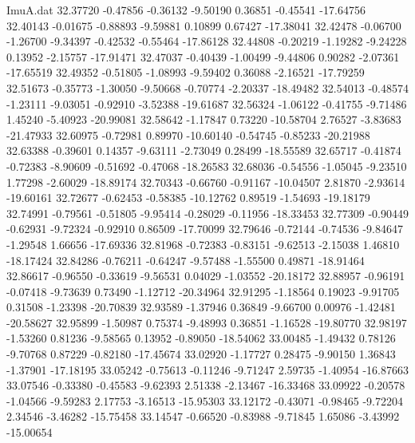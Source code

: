 \begin{filecontents}{ImuA.dat}
  32.37720   -0.47856   -0.36132   -9.50190    0.36851   -0.45541  -17.64756
  32.40143   -0.01675   -0.88893   -9.59881    0.10899    0.67427  -17.38041
  32.42478   -0.06700   -1.26700   -9.34397   -0.42532   -0.55464  -17.86128
  32.44808   -0.20219   -1.19282   -9.24228    0.13952   -2.15757  -17.91471
  32.47037   -0.40439   -1.00499   -9.44806    0.90282   -2.07361  -17.65519
  32.49352   -0.51805   -1.08993   -9.59402    0.36088   -2.16521  -17.79259
  32.51673   -0.35773   -1.30050   -9.50668   -0.70774   -2.20337  -18.49482
  32.54013   -0.48574   -1.23111   -9.03051   -0.92910   -3.52388  -19.61687
  32.56324   -1.06122   -0.41755   -9.71486    1.45240   -5.40923  -20.99081
  32.58642   -1.17847    0.73220  -10.58704    2.76527   -3.83683  -21.47933
  32.60975   -0.72981    0.89970  -10.60140   -0.54745   -0.85233  -20.21988
  32.63388   -0.39601    0.14357   -9.63111   -2.73049    0.28499  -18.55589
  32.65717   -0.41874   -0.72383   -8.90609   -0.51692   -0.47068  -18.26583
  32.68036   -0.54556   -1.05045   -9.23510    1.77298   -2.60029  -18.89174
  32.70343   -0.66760   -0.91167  -10.04507    2.81870   -2.93614  -19.60161
  32.72677   -0.62453   -0.58385  -10.12762    0.89519   -1.54693  -19.18179
  32.74991   -0.79561   -0.51805   -9.95414   -0.28029   -0.11956  -18.33453
  32.77309   -0.90449   -0.62931   -9.72324   -0.92910    0.86509  -17.70099
  32.79646   -0.72144   -0.74536   -9.84647   -1.29548    1.66656  -17.69336
  32.81968   -0.72383   -0.83151   -9.62513   -2.15038    1.46810  -18.17424
  32.84286   -0.76211   -0.64247   -9.57488   -1.55500    0.49871  -18.91464
  32.86617   -0.96550   -0.33619   -9.56531    0.04029   -1.03552  -20.18172
  32.88957   -0.96191   -0.07418   -9.73639    0.73490   -1.12712  -20.34964
  32.91295   -1.18564    0.19023   -9.91705    0.31508   -1.23398  -20.70839
  32.93589   -1.37946    0.36849   -9.66700    0.00976   -1.42481  -20.58627
  32.95899   -1.50987    0.75374   -9.48993    0.36851   -1.16528  -19.80770
  32.98197   -1.53260    0.81236   -9.58565    0.13952   -0.89050  -18.54062
  33.00485   -1.49432    0.78126   -9.70768    0.87229   -0.82180  -17.45674
  33.02920   -1.17727    0.28475   -9.90150    1.36843   -1.37901  -17.18195
  33.05242   -0.75613   -0.11246   -9.71247    2.59735   -1.40954  -16.87663
  33.07546   -0.33380   -0.45583   -9.62393    2.51338   -2.13467  -16.33468
  33.09922   -0.20578   -1.04566   -9.59283    2.17753   -3.16513  -15.95303
  33.12172   -0.43071   -0.98465   -9.72204    2.34546   -3.46282  -15.75458
  33.14547   -0.66520   -0.83988   -9.71845    1.65086   -3.43992  -15.00654

\end{filecontents}
